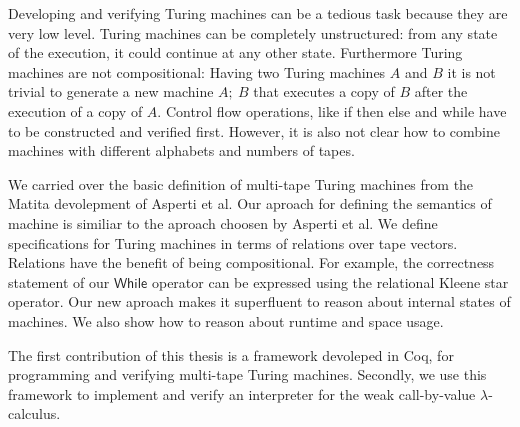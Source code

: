 Developing and verifying Turing machines can be a tedious task because they are very low level.  Turing machines can be completely unstructured:
from any state of the execution, it could continue at any other state.  Furthermore Turing machines are not compositional: Having two Turing
machines $A$ and $B$ it is not trivial to generate a new machine $A;~B$ that executes a copy of $B$ after the execution of a copy of $A$.
Control flow operations, like if then else and while have to be constructed and verified first.  However, it is also not clear how to combine
machines with different alphabets and numbers of tapes.

We carried over the basic definition of multi-tape Turing machines from the Matita devolepment of Asperti et al.  Our aproach for defining the
semantics of machine is similiar to the aproach choosen by Asperti et al.  We define specifications for Turing machines in terms of relations over
tape vectors.  Relations have the benefit of being compositional.  For example, the correctness statement of our $\mathsf{While}$ operator can be
expressed using the relational Kleene star operator.  Our new aproach makes it superfluent to reason about internal states of machines.  We also
show how to reason about runtime and space usage.

The first contribution of this thesis is a framework devoleped in Coq, for programming and verifying multi-tape Turing machines.  Secondly, we use
this framework to implement and verify an interpreter for the weak call-by-value $\lambda$-calculus.



